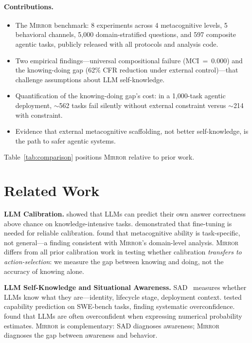 \documentclass[10pt]{article}
\newcommand{\mirror}{\textsc{Mirror}}
\newcommand{\MCI}{MCI}
\newcommand{\CFR}{CFR}
\begin{document}
\paragraph{Contributions.}
\begin{itemize}
  \setlength\itemsep{2pt}
  \item The \mirror{} benchmark: 8 experiments across 4 metacognitive levels, 5
        behavioral channels, 5,000 domain-stratified questions, and 597 composite
        agentic tasks, publicly released with all protocols and analysis code.
  \item Two empirical findings---universal compositional failure
        (\MCI{}~=~0.000) and the knowing-doing gap (62\% \CFR{} reduction
        under external control)---that challenge assumptions about LLM
        self-knowledge.
  \item Quantification of the knowing-doing gap's cost: in a 1,000-task agentic
        deployment, $\sim$562 tasks fail silently without external constraint
        versus $\sim$214 with constraint.
  \item Evidence that external metacognitive scaffolding, not better
        self-knowledge, is the path to safer agentic systems.
\end{itemize}

Table~\ref{tab:comparison} positions \mirror{} relative to prior work.



\section{Related Work}
\label{sec:related}

\textbf{LLM Calibration.}
\citet{kadavath2022language} showed that LLMs can predict their own answer
correctness above chance on knowledge-intensive tasks.
\citet{kapoor2024calibration} demonstrated that fine-tuning is needed for reliable
calibration. \citet{steyvers2025calibration} found that metacognitive ability is
task-specific, not general---a finding consistent with \mirror{}'s domain-level
analysis. \mirror{} differs from all prior calibration work in testing whether
calibration \textit{transfers to action-selection}: we measure the gap between
knowing and doing, not the accuracy of knowing alone.

\textbf{LLM Self-Knowledge and Situational Awareness.}
SAD~\citep{laine2024me} measures whether LLMs know what they are---identity,
lifecycle stage, deployment context. \citet{barkan2025llms} tested capability
prediction on SWE-bench tasks, finding systematic overconfidence.
\citet{xiong2023can} found that LLMs are often overconfident when expressing
numerical probability estimates. \mirror{} is complementary: SAD diagnoses
awareness; \mirror{} diagnoses the gap between awareness and behavior.
\end{document}
